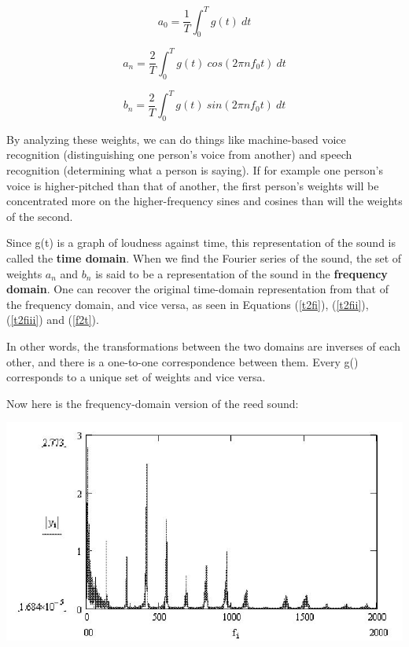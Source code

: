 \begin{equation}
\label{t2fi}
a_{0}=\frac{1}{T}\int _{0}^{T}g(t) ~ dt
\end{equation}

\begin{equation}
\label{t2fii}
a_{n}=\frac{2}{T}\int _{0}^{T}g(t) ~ cos(2\pi nf_{0}t) ~ dt
\end{equation}

\begin{equation}
\label{t2fiii}
b_{n}=\frac{2}{T}\int _{0}^{T}g(t) ~ sin(2\pi nf_{0}t) ~ dt
\end{equation}

By analyzing these weights, we can do things like machine-based voice
recognition (distinguishing one person's voice from another) and speech
recognition (determining what a person is saying).  If for example one
person's voice is higher-pitched than that of another, the first
person's weights will be concentrated more on the
higher-frequency sines and cosines than will the weights of the second.

Since g(t) is a graph of loudness against time, this representation of
the sound is called the {\bf time domain}.  When we find the Fourier
series of the sound, the set of weights $a_n$ and $b_n$ is said to be a
representation of the sound in the {\bf frequency domain}.  One can
recover the original time-domain representation from that of the
frequency domain, and vice versa, as seen in Equations (\ref{t2fi}),
(\ref{t2fii}), (\ref{t2fiii}) and (\ref{f2t}).  

In other words, the transformations between the two domains are inverses
of each other, and there is a one-to-one correspondence between them.
Every g() corresponds to a unique set of weights and vice versa.

Now here is the frequency-domain version of the reed sound:

\includegraphics{Images/ReedFreq.jpg}

